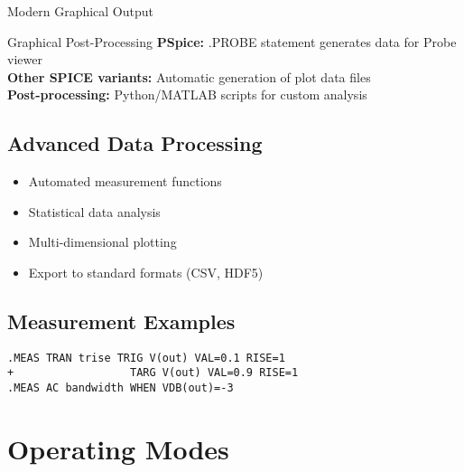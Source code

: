 \documentclass{beamer}
\begin{document}
\begin{frame}{Modern Graphical Output}
    \begin{alertblock}{Graphical Post-Processing}
        \textbf{PSpice:} .PROBE statement generates data for Probe viewer \\
        \textbf{Other SPICE variants:} Automatic generation of plot data files \\
        \textbf{Post-processing:} Python/MATLAB scripts for custom analysis
    \end{alertblock}
    
    \subsection{Advanced Data Processing}
    \begin{itemize}
        \item Automated measurement functions
        \item Statistical data analysis
        \item Multi-dimensional plotting
        \item Export to standard formats (CSV, HDF5)
    \end{itemize}
    
    \subsection{Measurement Examples}
    \begin{lstlisting}
.MEAS TRAN trise TRIG V(out) VAL=0.1 RISE=1 
+                  TARG V(out) VAL=0.9 RISE=1
.MEAS AC bandwidth WHEN VDB(out)=-3
    \end{lstlisting}
\end{frame}

\section{Operating Modes}
\end{document}
